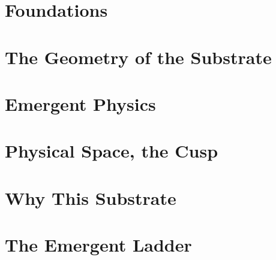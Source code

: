 \documentclass{article}
\begin{document}
\maketitle



\tableofcontents

\part{Foundations}





\part{The Geometry of the Substrate}








\part{Emergent Physics}









\part{Physical Space, the Cusp}





\part{Why This Substrate}






\part{The Emergent Ladder}








\end{document}
